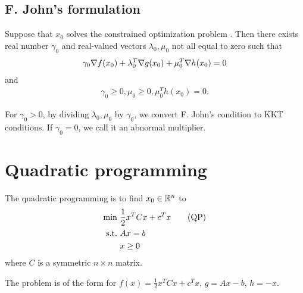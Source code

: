 \subsection{F. John's formulation}

\begin{theorem}
Suppose that $x_0$ solves the constrained optimization problem .
Then there exists real number $\gamma_0$ and real-valued vectors $\lambda_0, \mu_0$ not all equal to zero such that 
\begin{align}
\gamma_0 \nabla f(x_0) + \lambda_0^T \nabla g(x_0) + \mu_0^T \nabla h(x_0) = 0
\end{align}
and 
\begin{align}
\gamma_0 \ge 0, \mu_0 \ge 0, \mu_0^T h(x_0) = 0.
\end{align}
\end{theorem}

\begin{remark}
For $\gamma_0 > 0$, by dividing $\lambda_0, \mu_0$ by $\gamma_0$, we convert F. John's condition to KKT conditions.
If $\gamma_0 = 0$, we call it an abnormal multiplier.
\end{remark}

\section{Quadratic programming}

The quadratic programming is to find $x_0 \in \mathbb{R}^n$ to 
\begin{align}
\min \ & \frac{1}{2} x^T C x + c^T x \tag{QP} \labeq{QP} \\
\st    & A x = b \nonumber \\
       & x \ge 0 \nonumber
\end{align}
where $C$ is a symmetric $n \times n$ matrix.

The problem  is of the form  for $f(x) = \frac{1}{2} x^T C x + c^T x$, $g = Ax - b$, $h = -x$.

